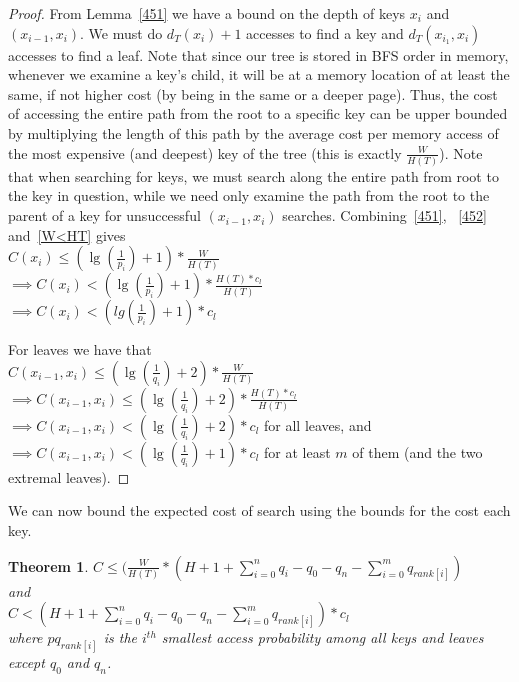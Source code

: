 \documentclass[letterpaper,12pt,titlepage,oneside,final]{book}
\theoremstyle{plain}
\newtheorem{thm}{Theorem}[section]
\begin{document}
\begin{proof}
From Lemma~\ref{451} we have a bound on the depth of keys $x_i$ and $(x_{i-1},x_i)$. We must do $d_T(x_i) + 1$ accesses to find a key and $d_T(x_{i_1},x_i)$ accesses to find a leaf. Note that since our tree is stored in BFS order in memory, whenever we examine a key's child, it will be at a memory location of at least the same, if not higher cost (by being in the same or a deeper page). Thus, the cost of accessing the entire path from the root to a specific key can be upper bounded by multiplying the length of this path by the average cost per memory access of the most expensive (and deepest) key of the tree (this is exactly $\frac{W}{H(T)}$). Note that when searching for keys, we must search along the entire path from root to the key in question, while we need only examine the path from the root to the parent of a key for unsuccessful $(x_{i-1},x_i)$ searches. Combining~\ref{451}, ~\ref{452} and~\ref{W<HT} gives \\
$C(x_i) \leq (\lg(\frac{1}{p_i})+1)*\frac{W}{H(T)}$   \\
$\implies C(x_i) < (\lg(\frac{1}{p_i})+1)*\frac{H(T)*c_l}{H(T)}$   \\
$\implies C(x_i) < (lg(\frac{1}{p_i})+1)*c_l$

For leaves we have that\\

$C(x_{i-1},x_i) \leq (\lg(\frac{1}{q_i})+2)*\frac{W}{H(T)}$   \\
$\implies C(x_{i-1},x_i) \leq (\lg(\frac{1}{q_i})+2)*\frac{H(T)*c_l}{H(T)}$   \\
$\implies C(x_{i-1},x_i) < (\lg(\frac{1}{q_i})+2)*c_l$ for all leaves, and \\
$\implies C(x_{i-1},x_i) < (\lg(\frac{1}{q_i})+1)*c_l$ for at least $m$ of them (and the two extremal leaves).

\end{proof}

We can now bound the expected cost of search using the bounds for the cost each key.

\begin{thm} \label{ApproxMWPagingThm}
$C \leq  (\frac{W}{H(T)} * (H + 1 + \sum_{i=0}^n q_i - q_0 - q_n - \sum_{i=0}^m q_{rank[i]})$ \\
and \\
$C < (H + 1 + \sum_{i=0}^n q_i - q_0 - q_n - \sum_{i=0}^m q_{rank[i]}) * c_l$ \\
where $pq_{rank[i]}$ is the $i^{th}$ smallest access probability among all keys and leaves except $q_0$ and $q_n$.
\end{thm}
\end{document}
